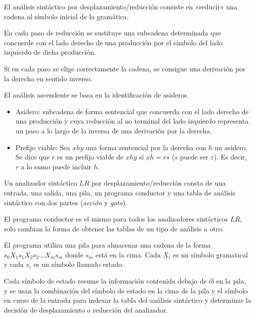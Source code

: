 %

El análisis sintáctico por desplazamiento/reducción consiste en «reducir» una cadena al símbolo inicial de la gramática.

En cada paso de reducción se sustituye una subcadena determinada que concuerde con el lado derecho de una producción por el símbolo del lado izquierdo de dicha producción.

Si en cada paso se elige correctamente la cadena, se consigue una derivación por la derecha en sentido inverso.

El análisis ascendente se basa en la identificación de asideros.
\begin{itemize}
	\item Asidero: subcadena de forma sentencial que concuerda con el lado derecho de una producción y cuya reducción al no terminal del lado izquierdo representa un paso a lo largo de la inversa de una derivación por la derecha.
	\item Prefijo viable: Sea $xhy$ una forma sentencial por la derecha con $h$ un asidero. Se dice que $r$ es un prefijo viable de $xhy$ si $xh=rs$ ($s$ puede ser $\varepsilon$). Es decir, $r$ a lo sumo puede incluir $h$.
\end{itemize}

Un analizador sintáctico $LR$ por desplazamiento/reducción consta de una entrada, una salida, una pila, un programa conductor y una tabla de análisis sintáctico con dos partes (\textit{acción} y \textit{goto}).

El programa conductor es el mismo para todos los analizadores sintácticos $LR$, solo cambian la forma de obtener las tablas de un tipo de análisis a otro.

El programa utiliza una pila para almacenar una cadena de la forma $s_{0}X_{1}s_{1}X_{2}s_{2}\ldots X_{m}s_{m} $ donde $s_{m}$ está en la cima. Cada $X_{i}$ es un símbolo gramatical y cada $s_{i}$ es un símbolo llamado estado.

Cada símbolo de estado resume la información contenida debajo de él en la pila, y se usan la combinación del símbolo de estado en la cima de la pila y el símbolo en curso de la entrada para indexar la tabla del análisis sintáctico y determinar la decisión de desplazamiento o reducción del analizador. 

